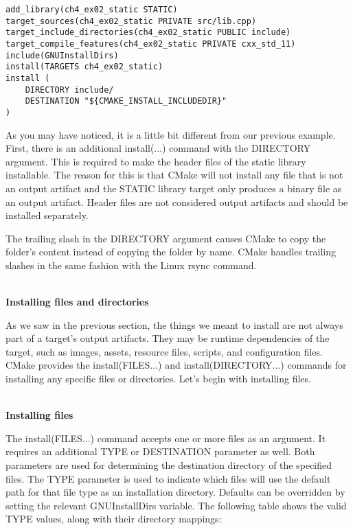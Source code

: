 \begin{lstlisting}[style=styleCMake]
add_library(ch4_ex02_static STATIC)
target_sources(ch4_ex02_static PRIVATE src/lib.cpp)
target_include_directories(ch4_ex02_static PUBLIC include)
target_compile_features(ch4_ex02_static PRIVATE cxx_std_11)
include(GNUInstallDirs)
install(TARGETS ch4_ex02_static)
install (
	DIRECTORY include/
	DESTINATION "${CMAKE_INSTALL_INCLUDEDIR}"
)
\end{lstlisting}

As you may have noticed, it is a little bit different from our previous example. First, there is an additional install(...) command with the DIRECTORY argument. This is required to make the header files of the static library installable. The reason for this is that CMake will not install any file that is not an output artifact and the STATIC library target only produces a binary file as an output artifact. Header files are not considered output artifacts and should be installed separately.

\begin{tcolorbox}[colback=webgreen!5!white,colframe=webgreen!75!black,title=Note]
The trailing slash in the DIRECTORY argument causes CMake to copy the folder's content instead of copying the folder by name. CMake handles trailing slashes in the same fashion with the Linux rsync command.
\end{tcolorbox}

\hspace*{\fill} \\ %
\noindent
\textbf{Installing files and directories}

As we saw in the previous section, the things we meant to install are not always part of a target's output artifacts. They may be runtime dependencies of the target, such as images, assets, resource files, scripts, and configuration files. CMake provides the install(FILES...) and install(DIRECTORY...) commands for installing any specific files or directories. Let's begin with installing files.

\hspace*{\fill} \\ %
\noindent
\textbf{Installing files}
 
The install(FILES...) command accepts one or more files as an argument. It requires an additional TYPE or DESTINATION parameter as well. Both parameters are used for determining the destination directory of the specified files. The TYPE parameter is used to indicate which files will use the default path for that file type as an installation directory. Defaults can be overridden by setting the relevant GNUInstallDirs variable. The following table shows the valid TYPE values, along with their directory mappings:

